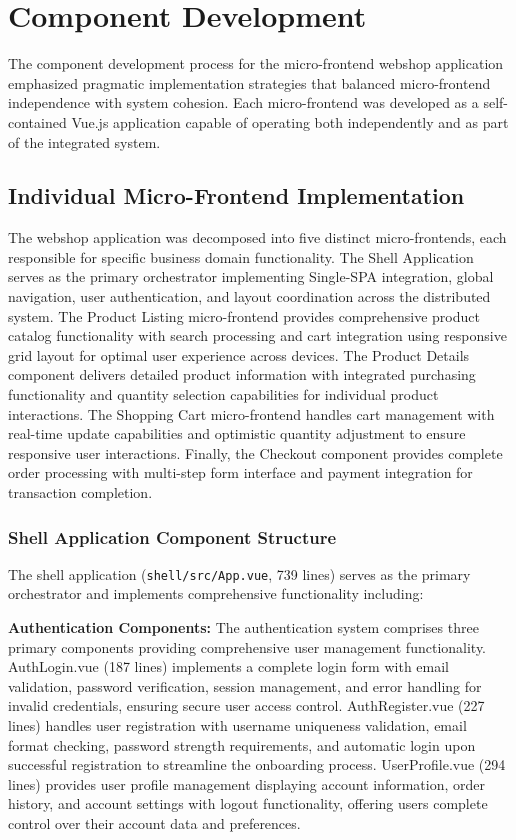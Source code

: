 \documentclass[12pt,a4paper]{report}
\begin{document}
\section{Component Development}

The component development process for the micro-frontend webshop application emphasized pragmatic implementation strategies that balanced micro-frontend independence with system cohesion. Each micro-frontend was developed as a self-contained Vue.js application capable of operating both independently and as part of the integrated system.

\subsection{Individual Micro-Frontend Implementation}

The webshop application was decomposed into five distinct micro-frontends, each responsible for specific business domain functionality. The Shell Application serves as the primary orchestrator implementing Single-SPA integration, global navigation, user authentication, and layout coordination across the distributed system. The Product Listing micro-frontend provides comprehensive product catalog functionality with search processing and cart integration using responsive grid layout for optimal user experience across devices. The Product Details component delivers detailed product information with integrated purchasing functionality and quantity selection capabilities for individual product interactions. The Shopping Cart micro-frontend handles cart management with real-time update capabilities and optimistic quantity adjustment to ensure responsive user interactions. Finally, the Checkout component provides complete order processing with multi-step form interface and payment integration for transaction completion.

\subsubsection{Shell Application Component Structure}

The shell application (\texttt{shell/src/App.vue}, 739 lines) serves as the primary orchestrator and implements comprehensive functionality including:

\textbf{Authentication Components:} The authentication system comprises three primary components providing comprehensive user management functionality. AuthLogin.vue (187 lines) implements a complete login form with email validation, password verification, session management, and error handling for invalid credentials, ensuring secure user access control. AuthRegister.vue (227 lines) handles user registration with username uniqueness validation, email format checking, password strength requirements, and automatic login upon successful registration to streamline the onboarding process. UserProfile.vue (294 lines) provides user profile management displaying account information, order history, and account settings with logout functionality, offering users complete control over their account data and preferences.
\end{document}
